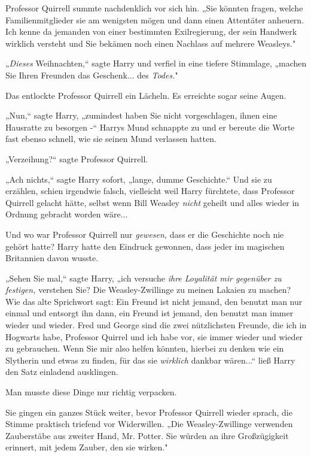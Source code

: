 {Professor Quirrell summte nachdenklich vor sich hin. „Sie könnten fragen, welche Familienmitglieder sie am wenigsten mögen und dann einen Attentäter anheuern. Ich kenne da jemanden von einer bestimmten Exilregierung, der sein Handwerk wirklich versteht und Sie bekämen noch einen Nachlass auf mehrere Weasleys."

„\emph{Dieses} Weihnachten,“ sagte Harry und verfiel in eine tiefere Stimmlage, „machen Sie Ihren Freunden das Geschenk... des \emph{Todes.}"

Das entlockte Professor Quirrell ein Lächeln. Es erreichte sogar seine Augen.

„Nun,“ sagte Harry, „zumindest haben Sie nicht vorgeschlagen, ihnen eine Hausratte zu besorgen -“ Harrys Mund schnappte zu und er bereute die Worte fast ebenso schnell, wie sie seinen Mund verlassen hatten.

„Verzeihung?“ sagte Professor Quirrell.

„Ach nichts,“ sagte Harry sofort, „lange, dumme Geschichte.“ Und sie zu erzählen, schien irgendwie falsch, vielleicht weil Harry fürchtete, dass Professor Quirrell gelacht hätte, selbst wenn Bill Weasley \emph{nicht} geheilt und alles wieder in Ordnung gebracht worden wäre...

Und wo war Professor Quirrell nur \emph{gewesen,} dass er die Geschichte noch nie gehört hatte? Harry hatte den Eindruck gewonnen, dass jeder im magischen Britannien davon wusste.

„Sehen Sie mal,“ sagte Harry, „ich versuche \emph{ihre Loyalität mir gegenüber zu festigen,} verstehen Sie? Die Weasley-Zwillinge zu meinen Lakaien zu machen? Wie das alte Sprichwort sagt: Ein Freund ist nicht jemand, den benutzt man nur einmal und entsorgt ihn dann, ein Freund ist jemand, den benutzt man immer wieder und wieder. Fred und George sind die zwei nützlichsten Freunde, die ich in Hogwarts habe, Professor Quirrel und ich habe vor, sie immer wieder und wieder zu gebrauchen. Wenn Sie mir also helfen könnten, hierbei zu denken wie ein Slytherin und etwas zu finden, für das sie \emph{wirklich} dankbar wären...“ ließ Harry den Satz einladend ausklingen.

Man musste diese Dinge nur richtig verpacken.

Sie gingen ein ganzes Stück weiter, bevor Professor Quirrell wieder sprach, die Stimme praktisch triefend vor Widerwillen. „Die Weasley-Zwillinge verwenden Zauberstäbe aus zweiter Hand, Mr. Potter. Sie würden an ihre Großzügigkeit erinnert, mit jedem Zauber, den sie wirken."

}
